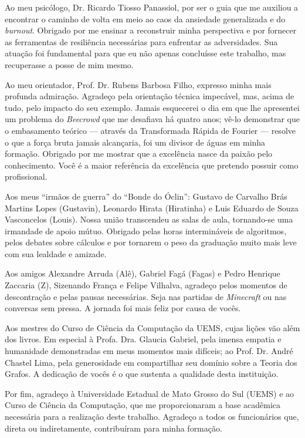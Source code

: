 \documentclass[
	12pt,		%
	a4paper,	%
	openright,  %
	oneside,	%
	chapter=TITLE,		%
	section=TITLE,		%
	english,	%
	brazilian   %
]{abntex2}
\begin{document}
\begin{agradecimentos}
	\par{
        Ao meu psicólogo, Dr. Ricardo Tiosso Panassiol, por ser o guia que me auxiliou a encontrar o caminho de
        volta em meio ao caos da ansiedade generalizada e do \textit{burnout}. Obrigado por me ensinar a reconstruir
        minha perspectiva e por fornecer as ferramentas de resiliência necessárias para enfrentar as adversidades.
        Sua atuação foi fundamental para que eu não apenas concluísse este trabalho, mas recuperasse a posse de mim mesmo.
    }

	\par{
        Ao meu orientador, Prof. Dr. Rubens Barbosa Filho, expresso minha mais profunda admiração. Agradeço
        pela orientação técnica impecável, mas, acima de tudo, pelo impacto do seu exemplo. Jamais esquecerei o dia
        em que lhe apresentei um problema do \textit{Beecrowd} que me desafiava há quatro anos; vê-lo demonstrar que
        o embasamento teórico — através da Transformada Rápida de Fourier — resolve o que a força bruta jamais
        alcançaria, foi um divisor de águas em minha formação. Obrigado por me mostrar que a excelência nasce da
        paixão pelo conhecimento. Você é a maior referência da excelência que pretendo possuir como profissional.
    }

	\par{
        Aos meus ``irmãos de guerra'' do ``Bonde do Óclin'': Gustavo de Carvalho Brás Martins Lopes (Gustavin),
        Leonardo Hirata (Hiratinha) e Luis Eduardo de Souza Vasconcelos (Louis). Nossa união transcendeu as salas de
        aula, tornando-se uma irmandade de apoio mútuo. Obrigado pelas horas intermináveis de algoritmos, pelos
        debates sobre cálculos e por tornarem o peso da graduação muito mais leve com sua lealdade e amizade.
    }

	\par{
        Aos amigos Alexandre Arruda (Alê), Gabriel Fagá (Fagas) e Pedro Henrique Zaccaria (Z), Sizenando França e 
        Felipe Vilhalva, agradeço pelos momentos de descontração e pelas pausas necessárias. 
        Seja nas partidas de \textit{Minecraft} ou nas conversas sem pressa. 
        A jornada foi mais feliz por causa de vocês.
    }

	\par{
        Aos mestres do Curso de Ciência da Computação da UEMS, cujas lições vão além dos livros. Em especial à
        Profa. Dra. Glaucia Gabriel, pela imensa empatia e humanidade demonstradas em meus momentos mais difíceis;
        ao Prof. Dr. André Chastel Lima, pela generosidade em compartilhar seu domínio sobre a Teoria dos Grafos. A
        dedicação de vocês é o que sustenta a qualidade desta instituição.
    }

	\par{
        Por fim, agradeço à Universidade Estadual de Mato Grosso do Sul (UEMS) e ao Curso de Ciência da
        Computação, que me proporcionaram a base acadêmica necessária para a realização deste trabalho. Agradeço a
        todos os funcionários que, direta ou indiretamente, contribuíram para minha formação.
    }

\end{agradecimentos}
\end{document}
